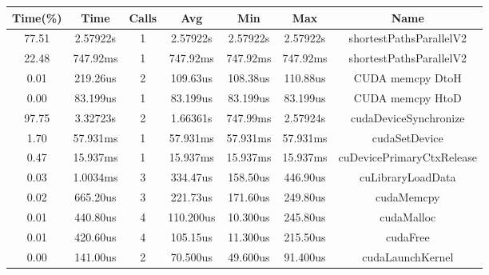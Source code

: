 \documentclass[
	a4paper, %
	12pt, %
]{class}
\begin{document}
\begin{center}
    \begin{adjustbox}{width=1\textwidth}
        \begin{tabular}{ |c|c|c|c|c|c|c| }
            \hline
            \textbf{Time(\%)}  & \textbf{Time}  & \textbf{Calls} & \textbf{Avg}  & \textbf{Min} & \textbf{Max}  & \textbf{Name}       \\ \hline
            77.51     & 2.57922s  &   1   &   2.57922s    &  2.57922s  &  2.57922s &  shortestPathsParallelV2                             \\ \hline
            22.48     & 747.92ms  &   1   &   747.92ms    &  747.92ms  &  747.92ms &  shortestPathsParallelV2                             \\ \hline
            0.01      & 219.26us  &   2   &   109.63us    &  108.38us  &  110.88us &  CUDA memcpy DtoH                                    \\ \hline
            0.00      & 83.199us  &   1   &   83.199us    &  83.199us  &  83.199us &  CUDA memcpy HtoD                                    \\ \hline
            97.75     & 3.32723s  &   2   &   1.66361s    &  747.99ms  &  2.57924s &  cudaDeviceSynchronize                               \\ \hline
            1.70      & 57.931ms  &   1   &   57.931ms    &  57.931ms  &  57.931ms &  cudaSetDevice                                       \\ \hline
            0.47      & 15.937ms  &   1   &   15.937ms    &  15.937ms  &  15.937ms &  cuDevicePrimaryCtxRelease                           \\ \hline
            0.03      & 1.0034ms  &   3   &   334.47us    &   158.50us &  446.90us &  cuLibraryLoadData                                   \\ \hline
            0.02      & 665.20us  &   3   &   221.73us    &  171.60us  &  249.80us &  cudaMemcpy                                          \\ \hline
            0.01      & 440.80us  &   4   &   110.200us   &  10.300us  &  245.80us &  cudaMalloc                                          \\ \hline
            0.01      & 420.60us  &   4   &   105.15us    &  11.300us  &  215.50us &  cudaFree                                            \\ \hline
            0.00      & 141.00us  &   2   &   70.500us    &  49.600us  &  91.400us &  cudaLaunchKernel                                    \\ \hline

\end{tabular}
\end{adjustbox}
\end{center}
\end{document}
